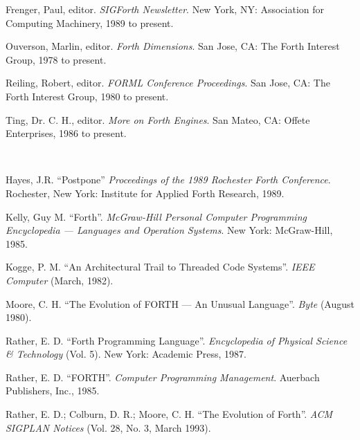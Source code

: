 \begin{description}
\begin{description}
	\item Frenger, Paul, editor.
		\emph{SIGForth Newsletter}.
		New York, NY: Association for Computing Machinery, 1989 to present.

	\item Ouverson, Marlin, editor.
		\emph{Forth Dimensions}.
		San Jose, CA: The Forth Interest Group, 1978 to present.

	\item Reiling, Robert, editor.
		\emph{FORML Conference Proceedings}.
		San Jose, CA: The Forth Interest Group, 1980 to present.

	\item Ting, Dr. C. H., editor.
		\emph{More on Forth Engines}.
		San Mateo, CA: Offete Enterprises, 1986 to present.
	\end{description}


\item[Selected articles]~

	\begin{description}
	\item Hayes, J.R.
		``Postpone''
		\emph{Proceedings of the 1989 Rochester Forth Conference}.
		Rochester, New York: Institute for Applied Forth Research, 1989.

	\item Kelly, Guy M.
		``Forth''.
		\emph{McGraw-Hill Personal Computer Programming Encyclopedia
		--- Languages and Operation Systems}.
		New York: McGraw-Hill, 1985.

	\item Kogge, P. M.
		``An Architectural Trail to Threaded Code Systems''.
		\emph{IEEE Computer} (March, 1982).

	\item Moore, C. H.
		``The Evolution of FORTH --- An Unusual Language''.
		\emph{Byte} (August 1980).

	\item Rather, E. D.
		``Forth Programming Language''.
		\emph{Encyclopedia of Physical Science \& Technology} (Vol. 5).
		New York: Academic Press, 1987.

	\item Rather, E. D.
		``FORTH''.
		\emph{Computer Programming Management}.
		Auerbach Publishers, Inc., 1985.

	\item Rather, E. D.; Colburn, D. R.; Moore, C. H.
		``The Evolution of Forth''.
		\emph{ACM SIGPLAN Notices} (Vol. 28, No. 3, March 1993).
	\end{description}

\end{description}

